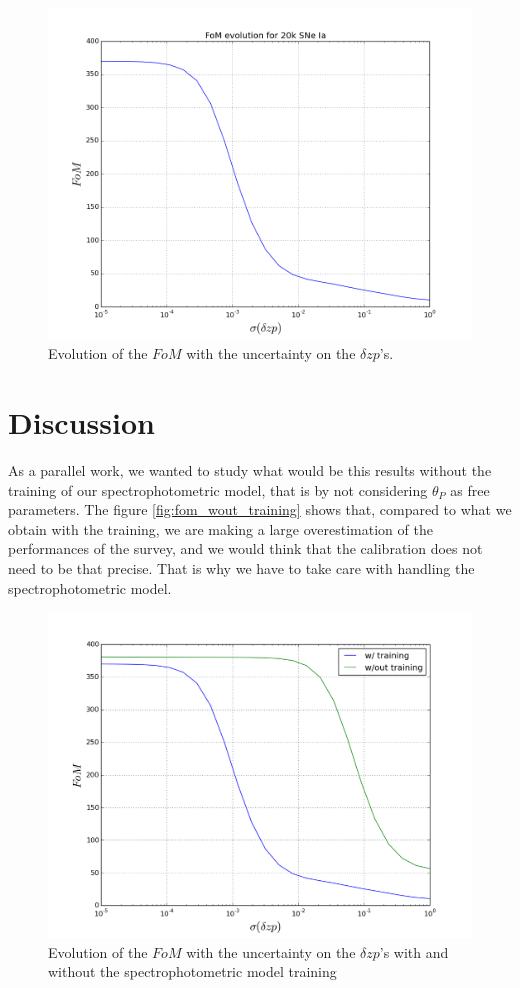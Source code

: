 \documentclass[\docopts]{\docclass}
\begin{document}
\begin{figure}[ht]
  \centering
  \includegraphics[width=0.7\linewidth]{FoM_20k.png}
  \caption{Evolution of the $FoM$ with the uncertainty on the $\delta zp$'s.}
  \label{fig:fom_zp}
\end{figure}


\section{Discussion}
\label{sec:discussion}
As a parallel work, we wanted to study what would be this results without the training of our spectrophotometric model, that is by not considering $\theta_P$ as free parameters.
The figure \ref{fig:fom_wout_training} shows that, compared to what we obtain with the training, we are making a large overestimation of the performances of the survey, and we would think that the calibration does not need to be that precise. That is why we have to take care with handling the spectrophotometric model.
\begin{figure}[ht]
  \centering
  \includegraphics[width=0.7\linewidth]{FoM_20k+training.png}
  \caption{Evolution of the $FoM$ with the uncertainty on the $\delta zp$'s with and without the spectrophotometric model training}
  \label{fig:fom_zp}
\end{figure}
\end{document}
